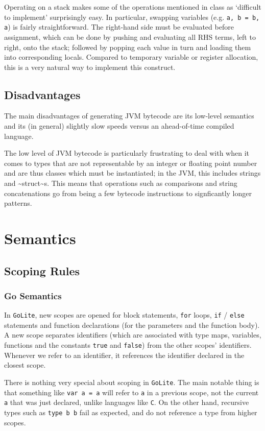 \documentclass[11pt]{article}
\begin{document}
Operating on a stack makes some of the operations mentioned in
class as `difficult to implement' surprisingly easy. In
particular, swapping variables (e.g. \texttt{a, b = b, a}) is fairly
straightforward. The right-hand side must be evaluated before
assignment, which can be done by pushing and evaluating all RHS
terms, left to right, onto the stack; followed by popping each
value in turn and loading them into corresponding locals. Compared
to temporary variable or register allocation, this is a very
natural way to implement this construct.

\subsection{Disadvantages}
\label{sec:orgbcf9cdb}
The main disadvantages of generating JVM bytecode are its low-level
semantics and its (in general) slightly slow speeds versus an
ahead-of-time compiled language.

The low level of JVM bytecode is particularly frustrating to deal
with when it comes to types that are not representable by an
integer or floating point number and are thus classes which must be
instantiated; in the JVM, this includes strings and \textasciitilde{}struct\textasciitilde{}s. This
means that operations such as comparisons and string concatenations
go from being a few bytecode instructions to signficantly longer
patterns.
\section{Semantics}
\label{sec:orgfaf28f5}
\subsection{Scoping Rules}
\label{sec:org3ebc203}
\subsubsection{Go Semantics}
\label{sec:orgfd626c6}
In \texttt{GoLite}, new scopes are opened for block statements, \texttt{for}
loops, \texttt{if} / \texttt{else} statements and function declarations (for the
parameters and the function body). A new scope separates
identifiers (which are associated with type maps, variables,
functions and the constants \texttt{true} and \texttt{false}) from the other
scopes' identifiers. Whenever we refer to an identifier, it
references the identifier declared in the closest scope.

There is nothing very special about scoping in \texttt{GoLite}. The main
notable thing is that something like \texttt{var a = a} will refer to \texttt{a}
in a previous scope, not the current \texttt{a} that was just declared,
unlike languages like \texttt{C}.  On the other hand, recursive types
such as \texttt{type b b} fail as expected, and do not reference a type
from higher scopes.
\end{document}
